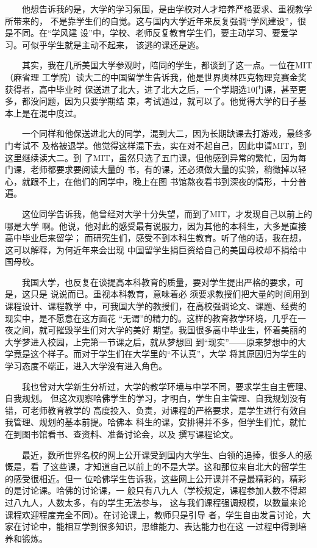 \documentclass[11pt]{ctexart}
\begin{document}
{{{{　　他想告诉我的是，大学的学习氛围，是由学校对人才培养严格要求、重视教学所带来的，
不是靠学生们的自觉。这与国内大学近年来反复强调“学风建设”，很是不同。在“学风建
设”中，学校、老师反复教育学生们，要主动学习、要爱学习。可似乎学生就是主动不起来，
该逃的课还是逃。


　　其实，我在几所美国大学参观时，陪同的学生，都谈到了这一点。一位在MIT（麻省理
工学院）读大二的中国留学生告诉我，他是世界奥林匹克物理竞赛金奖获得者，高中毕业时
保送进了北大，进了北大之后，一个学期选10门课，甚至更多，都没问题，因为只要学期结
束，考试通过，就可以了。他觉得大学的日子基本上是在混中度过。


　　一个同样和他保送进北大的同学，混到大二，因为长期缺课去打游戏，最终多门考试不
及格被退学。他觉得这样混下去，实在对不起自己，因此申请MIT，到这里继续读大二。到
了MIT，虽然只选了五门课，但他感到异常的繁忙，因为每门课，老师都要求要阅读大量的
书，有的课，还必须做大量的实验，稍微掉以轻心，就跟不上，在他们的同学中，晚上在图
书馆熬夜看书到深夜的情形，十分普遍。


　　这位同学告诉我，他曾经对大学十分失望，而到了MIT，才发现自己以前上的哪是大学
啊。他说，他对此的感受最有说服力，因为其他的本科生，大多是直接高中毕业后来留学；
而研究生们，感受不到本科生教育。听了他的话，我在想，这可以解释，为何近年来会出现
中国留学生捐巨资给自己的美国母校却不捐给中国母校。


　　我国大学，也反复在谈提高本科教育的质量，要对学生提出严格的要求，可是，这只是
说说而已。重视本科教育，意味着必 须要求教授们把大量的时间用到课程设计、课程教学
中，可我国大学的教授们，在高校强调论文、课题、经费的现实中，是不愿意在这方面花
“无谓”的精力的。这样的教育教学环境，几乎在一夜之间，就可摧毁学生们对大学的美好
期望。我国很多高中毕业生，怀着美丽的大学梦进入校园，上完第一节课之后，就从梦想回
到“现实”——原来梦想中的大学竟是这个样子。而对于学生们在大学里的“不认真”，大学
将其原因归为学生的学习态度不端正，进入大学没有进入角色。


　　我也曾对大学新生分析过，大学的教学环境与中学不同，要求学生自主管理、自我规划。
但这次观察哈佛学生的学习，才明白，学生自主管理、自我规划没有错，可老师教育教学的
高度投入、负责，对课程的严格要求，是学生进行有效自我管理、规划的基本前提。哈佛本
科生的课，安排得并不多，但学生们忙，就忙在到图书馆看书、查资料、准备讨论会，以及
撰写课程论文。


　　最近，数所世界名校的网上公开课受到国内大学生、白领的追捧，很多人的感慨是，看
了这些课，才知道自己以前上的不是大学。这和那位来自北大的留学生的感受很相近。但一
位哈佛学生告诉我，这些网上公开课并不是最精彩的，精彩的是讨论课。哈佛的讨论课，一
般只有八九人（学校规定，课程参加人数不得超过八九人，人数太多，有的学生无法参与，
这与我们课程强调规模，以数量来论课程欢迎程度完全不同）。在讨论课上，教师只是引导
者，学生自由发言讨论，大家在讨论中，能相互学到很多知识，思维能力、表达能力也在这
一过程中得到培养和锻炼。


}}}}
\end{document}
